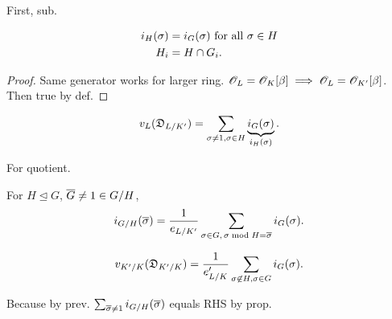 First, sub. 
\begin{pr}
\begin{align*}
i_H(\sigma)&=i_G(\sigma)\text{ for all $\sigma\in H$}\\
H_i&=H\cap G_i.
\end{align*}
\end{pr}
\begin{proof}
Same generator works for larger ring.
$\mathscr{O}_L=\mathscr{O}_K[\beta]\implies \mathscr{O}_L=\mathscr{O}_{K'}[\beta]$. Then true by def.
\end{proof}
\begin{cor}
\[
v_L(\mathfrak D_{L/K'})=\sum_{\sigma\ne 1,\sigma\in H} \underbrace{i_G(\sigma)}_{i_H(\sigma)}.
\]
\end{cor}
For quotient.
\begin{pr}
For $H\unlhd G$, $\overline{G}\ne 1\in G/H$,
\[
i_{G/H}(\overline{\sigma})=\frac{1}{e_{L/K'}}\sum_{\sigma\in G,\,\sigma\bmod H=\overline{\sigma}} i_G(\sigma).
\]
\end{pr}
\begin{cor}
\[
v_{K'/K}(\mathfrak D_{K'/K})=\frac{1}{e_{L/K}'} \sum_{\sigma\not\in H,\sigma\in G}i_G(\sigma).
\]
\end{cor}
Because by prev. $\sum_{\overline{\sigma}\ne 1} i_{G/H}(\overline{\sigma})$ equals RHS by prop.
